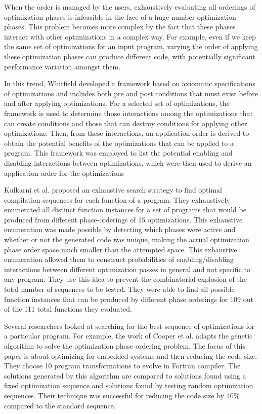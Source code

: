 When the order is managed by the users, exhaustively evaluating  all orderings of optimization phases is infeasible in the face of a huge number optimization phases. This problem becomes more complex by the fact that these phases interact with other optimizations in a complex way.
For example, even if we keep the same set of optimizations for an input program, varying the order of applying these optimization phases can produce different code, with potentially significant performance variation amongst them. 

In this trend, Whitfield\cite{whitfield1990approach} developed a framework based on axiomatic specifications of optimizations and includes both pre and post conditions that must exist before and after applying optimizations. For a selected set of optimizations, the framework is used to determine those interactions among the optimizations that can create conditions and those that can destroy conditions for applying other optimizations. Then, from these interactions, an application order is derived to obtain the potential benefits of the optimizations that can be applied to a program. 
This framework was employed to list the potential enabling and disabling interactions between optimizations, which were then used to derive an application
order for the optimizations

Kulkarni et al.\cite{kulkarni2009practical,kulkarni2006exhaustive} proposed an exhaustive search strategy to find optimal compilation sequences for each function of a program. They exhaustively enumerated all distinct function instances for a set of programs that would be produced from different phase-orderings of 15 optimizations. This exhaustive enumeration was made possible by detecting which phases were active and whether or not the generated code was unique, making the actual optimization phase order space much smaller than the attempted space. This exhaustive enumeration allowed them to construct probabilities of enabling/disabling interactions between different optimization passes in general and not specific to any program. They use this idea to prevent the combinatorial explosion of the total number of sequences to be tested. 
They were able to find all possible function instances that can be produced by different phase orderings for 109 out of the 111 total functions they evaluated.


Several researchers looked at searching for the best sequence of optimizations for a particular program. For example, the work of Cooper et al.\cite{cooper1999optimizing} adapts the genetic algorithm to solve the optimization phase ordering problem. The focus of this paper is about optimizing for embedded systems and then reducing the code size. They choose 10 program transformations to evolve in Fortran compiler. The solutions generated by this algorithm are compared to solutions found using a fixed optimization sequence and solutions found by testing random optimization sequences. Their technique was successful for reducing the code size by 40\% compared to the standard sequence.


